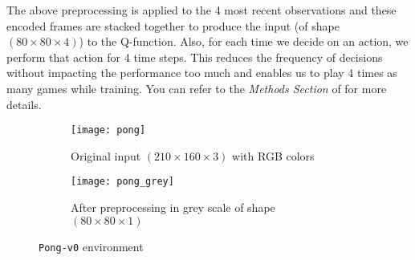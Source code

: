 \documentclass{article}
\begin{document}
The above preprocessing is applied to the 4 most recent observations and these encoded frames are stacked together to produce the input (of shape $(80 \times 80 \times 4)$) to the Q-function. Also, for each time we decide on an action, we perform that action for 4 time steps. This reduces the frequency of decisions without impacting the performance too much and enables us to play 4 times as many games while training. You can refer to the \textit{Methods Section} of \cite{mnih2015human} for more details.       \\  

\begin{figure}[H]
\centering
\begin{subfigure}[b]{.5\textwidth}
  \centering
  \texttt{[image: pong]}
  \caption{Original input $ (210 \times 160 \times 3) $ with RGB colors}
  \label{fig:pong}
\end{subfigure}
\begin{subfigure}[b]{.5\textwidth}
  \centering
  \texttt{[image: pong\_grey]}
  \caption{After preprocessing in grey scale of shape $ (80 \times 80 \times 1 ) $}
  \label{fig:pong_grey}
\end{subfigure}
\caption{\texttt{Pong-v0} environment}
\label{fig:pong_env}
\end{figure}
\end{document}
